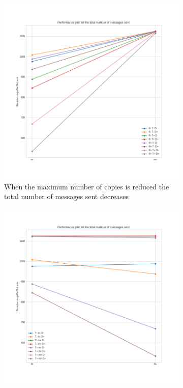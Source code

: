 \begin{figure}[hbt]
	\centering
	\begin{subfigure}[b]{0.33\textwidth}
		\centering
		\includegraphics[width=\textwidth]{img/hd/messages-m-perfplot}
		\caption{When the maximum number of copies is reduced the total
		number of messages sent decreases}\label{subfig:hdperfmessagesm}
	\end{subfigure}
	\begin{subfigure}[b]{0.33\textwidth}
		\centering
		\includegraphics[width=\textwidth]{img/hd/messages-R-perfplot}

\end{subfigure}
\end{figure}
